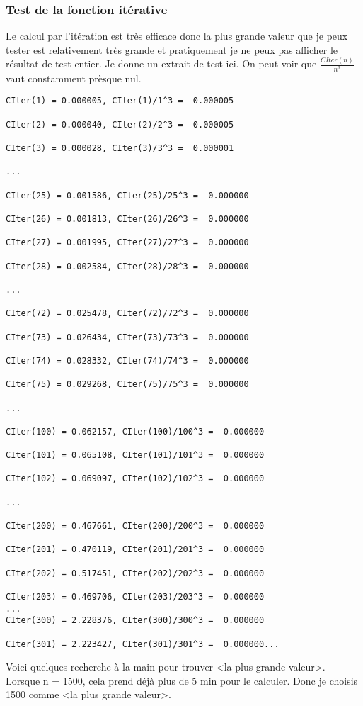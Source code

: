 \documentclass[french]{article}
\begin{document}
\subsubsection{Test de la fonction itérative}
Le calcul par l'itération est très efficace donc la plus grande valeur que je peux tester est relativement très grande et pratiquement je ne peux pas afficher le résultat de test entier. Je donne un extrait de test ici. On peut voir que $\frac{CIter(n)}{n^3}$ vaut constamment prèsque nul.
\begin{lstlisting}
CIter(1) = 0.000005, CIter(1)/1^3 =  0.000005

CIter(2) = 0.000040, CIter(2)/2^3 =  0.000005

CIter(3) = 0.000028, CIter(3)/3^3 =  0.000001

...

CIter(25) = 0.001586, CIter(25)/25^3 =  0.000000

CIter(26) = 0.001813, CIter(26)/26^3 =  0.000000

CIter(27) = 0.001995, CIter(27)/27^3 =  0.000000

CIter(28) = 0.002584, CIter(28)/28^3 =  0.000000

...

CIter(72) = 0.025478, CIter(72)/72^3 =  0.000000

CIter(73) = 0.026434, CIter(73)/73^3 =  0.000000

CIter(74) = 0.028332, CIter(74)/74^3 =  0.000000

CIter(75) = 0.029268, CIter(75)/75^3 =  0.000000

...

CIter(100) = 0.062157, CIter(100)/100^3 =  0.000000

CIter(101) = 0.065108, CIter(101)/101^3 =  0.000000

CIter(102) = 0.069097, CIter(102)/102^3 =  0.000000

...

CIter(200) = 0.467661, CIter(200)/200^3 =  0.000000

CIter(201) = 0.470119, CIter(201)/201^3 =  0.000000

CIter(202) = 0.517451, CIter(202)/202^3 =  0.000000

CIter(203) = 0.469706, CIter(203)/203^3 =  0.000000
...
CIter(300) = 2.228376, CIter(300)/300^3 =  0.000000

CIter(301) = 2.223427, CIter(301)/301^3 =  0.000000...
\end{lstlisting}
Voici quelques recherche à la main pour trouver <la plus grande valeur>. Lorsque n = 1500, cela prend déjà plus de 5 min pour le calculer. Donc je choisis 1500 comme <la plus grande valeur>.
\end{document}
